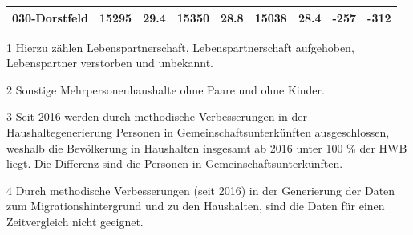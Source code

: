 \documentclass[
  a4paper,
  twoside]{article}
\begin{document}
\begin{table}[!h]
{\begin{threeparttable}
\begin{tabular}[t]{>{}l>{}r>{}r>{}r>{}r>{}r>{}r>{}r>{}r}
\hspace{1em}\hspace{1em}\textcolor{DoGray}{030-Dorstfeld} & \textcolor{DoGray}{15295} & \textcolor{DoGray}{29.4} & \textcolor{DoGray}{15350} & \textcolor{DoGray}{28.8} & \textcolor{DoGray}{15038} & \textcolor{DoGray}{28.4} & \textcolor{DoGray}{-257} & \textcolor{DoGray}{-312}\\
\bottomrule
\end{tabular}
\begin{tablenotes}
\small
\item[1] \textcolor{DoGray}{Hierzu zählen Lebenspartnerschaft, Lebenspartnerschaft aufgehoben, Lebenspartner verstorben und unbekannt.}
\item[2] \textcolor{DoGray}{Sonstige Mehrpersonenhaushalte ohne Paare und ohne Kinder.}
\item[3] \textcolor{DoGray}{Seit 2016 werden durch methodische Verbesserungen in der Haushaltegenerierung Personen in Gemeinschaftsunterkünften ausgeschlossen, weshalb die Bevölkerung in Haushalten insgesamt ab 2016 unter 100 \% der HWB liegt. Die Differenz sind die Personen in Gemeinschaftsunterkünften.}
\item[4] \textcolor{DoGray}{Durch methodische Verbesserungen (seit 2016) in der Generierung der Daten zum Migrationshintergrund und zu den Haushalten, sind die Daten für einen Zeitvergleich nicht geeignet.}
\end{tablenotes}
\end{threeparttable}}
\end{table}

\newpage
\end{document}
